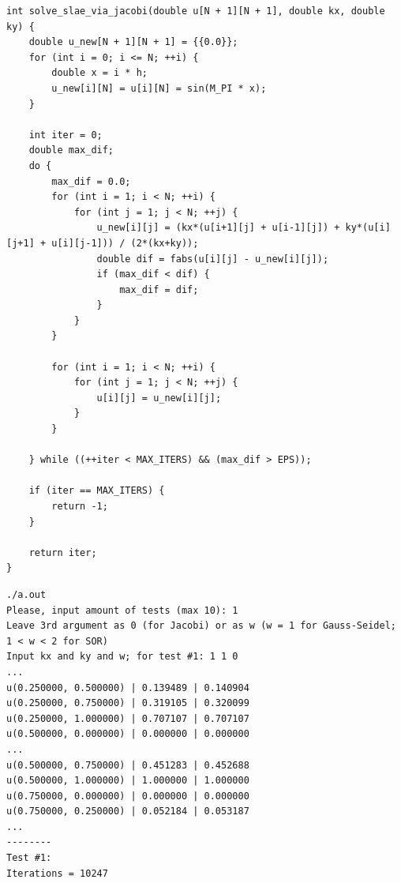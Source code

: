 \documentclass[a4paper, fleqn]{report}
\begin{document}
\lstset{language=C}
\begin{lstlisting}[title={Реализация метода Якоби}]
int solve_slae_via_jacobi(double u[N + 1][N + 1], double kx, double ky) {
    double u_new[N + 1][N + 1] = {{0.0}};
    for (int i = 0; i <= N; ++i) {
        double x = i * h;
        u_new[i][N] = u[i][N] = sin(M_PI * x);
    }

    int iter = 0;
    double max_dif;
    do {
        max_dif = 0.0;
        for (int i = 1; i < N; ++i) {
            for (int j = 1; j < N; ++j) {
                u_new[i][j] = (kx*(u[i+1][j] + u[i-1][j]) + ky*(u[i][j+1] + u[i][j-1])) / (2*(kx+ky));
                double dif = fabs(u[i][j] - u_new[i][j]);
                if (max_dif < dif) {
                    max_dif = dif;
                }
            }
        }

        for (int i = 1; i < N; ++i) {
            for (int j = 1; j < N; ++j) {
                u[i][j] = u_new[i][j];
            }
        }

    } while ((++iter < MAX_ITERS) && (max_dif > EPS));

    if (iter == MAX_ITERS) {
        return -1;
    }

    return iter;
}
\end{lstlisting}

\lstset{language=bash}
\begin{lstlisting}[title={Вывод (для некоторых точек, покоординатно кратных 0.25)}]
./a.out
Please, input amount of tests (max 10): 1
Leave 3rd argument as 0 (for Jacobi) or as w (w = 1 for Gauss-Seidel; 1 < w < 2 for SOR)
Input kx and ky and w; for test #1: 1 1 0
...
u(0.250000, 0.500000) | 0.139489 | 0.140904
u(0.250000, 0.750000) | 0.319105 | 0.320099
u(0.250000, 1.000000) | 0.707107 | 0.707107
u(0.500000, 0.000000) | 0.000000 | 0.000000
...
u(0.500000, 0.750000) | 0.451283 | 0.452688
u(0.500000, 1.000000) | 1.000000 | 1.000000
u(0.750000, 0.000000) | 0.000000 | 0.000000
u(0.750000, 0.250000) | 0.052184 | 0.053187
...
--------
Test #1:
Iterations = 10247
\end{lstlisting}
\newpage
\end{document}
